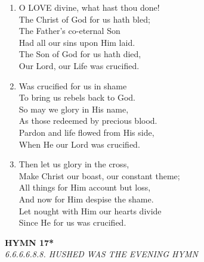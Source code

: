 \begin{enumerate}
    \item O LOVE divine, what hast thou done! \\
        The Christ of God for us hath bled; \\
        The Father's co-eternal Son \\
        Had all our sins upon Him laid. \\
        The Son of God for us hath died, \\
        Our Lord, our Life was crucified.

    \item Was crucified for us in shame \\
        To bring us rebels back to God. \\
        So may we glory in His name, \\
        As those redeemed by precious blood. \\
        Pardon and life flowed from His side, \\
        When He our Lord was crucified.

    \item Then let us glory in the cross, \\
        Make Christ our boast, our constant theme; \\
        All things for Him account but loss, \\
        And now for Him despise the shame. \\
        Let nought with Him our hearts divide \\
        Since He for us was crucified.

\end{enumerate}

\newpage
\begin{center}
    {\Large \textbf{HYMN 17*}}
    \\
    \textit{6.6.6.6.8.8. HUSHED WAS THE EVENING HYMN}
\end{center}
\vspace{1em}

